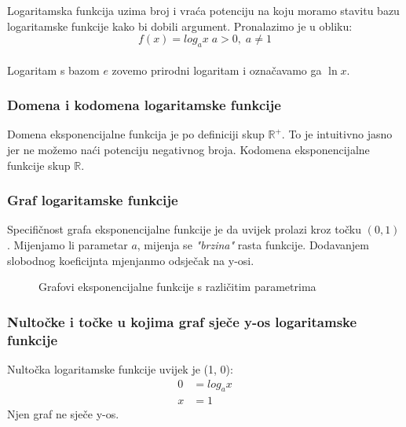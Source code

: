 \newcommand{\loga}{logaritamske funkcije}
Logaritamska funkcija uzima broj i vraća potenciju na koju moramo stavitu bazu logaritamske funkcije kako bi dobili argument.
Pronalazimo je u obliku:
\[f(x) = log_ax\;a > 0,\; a \neq 1\]
\\
Logaritam s bazom \(e\) zovemo prirodni logaritam i označavamo ga \(\ln{x}\).
\subsubsection{Domena i kodomena \loga}
    Domena eksponencijalne funkcija je po definiciji skup \(\mathbb{R^+}\).
    To je intuitivno jasno jer ne možemo naći potenciju negativnog broja.
    Kodomena eksponencijalne funkcije skup \(\mathbb{R}\).

\subsubsection{Graf \loga}
    Specifičnost grafa eksponencijalne funkcije je da uvijek prolazi kroz točku \((0, 1)\).
    Mijenjamo li parametar \(a\), mijenja se \emph{"brzina"} rasta funkcije.
    Dodavanjem slobodnog koeficijnta mjenjanmo odsječak na y-osi.
    \begin{figure}[ht]
        \centering
        \caption{Grafovi eksponencijalne funkcije s različitim parametrima}
        \label{fig:template}
    \end{figure}

\subsubsection{Nultočke i točke u kojima graf sječe y-os \loga}
    Nultočka logaritamske funkcije uvijek je (1, 0):
    \begin{equation*}
        \begin{split}
            0 &= log_ax \\
            x &= 1
        \end{split}
    \end{equation*}
    Njen graf ne sječe y-os.

